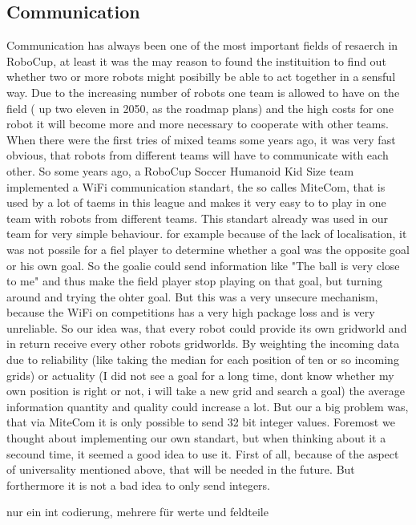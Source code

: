 \documentclass[lnicst,a4paper]{svmultln}
\begin{document}
\subsection{Communication}
Communication has always been one of the most important fields of resaerch in RoboCup, at least it was the may reason to found the instituition to find out whether two or more robots might posibilly be able to act together in a sensful way. 
Due to the increasing number of robots one team is allowed to have on the field ( up two eleven in 2050, as the roadmap plans) and the high costs for one robot it will become more and more necessary to cooperate with other teams. When there were the first tries of mixed teams some years ago, it was very fast obvious, that robots from different teams will have to communicate with each other.
So some years ago, a RoboCup Soccer Humanoid Kid Size team implemented a WiFi communication standart, the so calles MiteCom,  that is used by a lot of taems in this league and makes it very easy to to play in one team with robots from different teams.
This standart already was used in our team for very simple behaviour. for example because of the lack of localisation, it was not possile for a fiel player to determine whether a goal was the opposite goal or his own goal. So the goalie could send information like "The ball is very close to me" and thus make the field player stop playing on that goal, but turning around and trying the ohter goal. But this was a very unsecure mechanism, because the WiFi on competitions has a very high package loss and is very unreliable. 
So our idea was, that every robot could provide its own gridworld and in return receive every other robots gridworlds. By weighting the incoming data due to reliability (like taking the median for each position of ten or so incoming grids) or actuality (I did not see a goal for a long time, dont know whether my own position is right or not, i will take a new grid and search a goal) the average information quantity and quality could increase a lot.
But our a big problem was, that via MiteCom it is only possible to send 32 bit integer values. Foremost we thought about implementing our own standart, but when thinking about it a secound time, it seemed a good idea to use it. First of all, because of the aspect of universality mentioned above, that will be needed in the future. But forthermore it is not a bad idea to only send integers. 

nur ein int
codierung, mehrere für werte und feldteile

\end{document}
